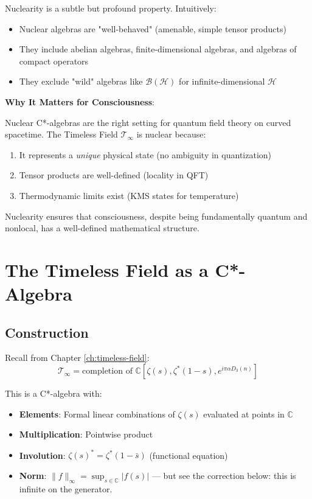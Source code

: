 \begin{level3}
Nuclearity is a subtle but profound property. Intuitively:

\begin{itemize}
\item Nuclear algebras are "well-behaved" (amenable, simple tensor products)
\item They include abelian algebras, finite-dimensional algebras, and algebras of compact operators
\item They exclude "wild" algebras like $\mathcal{B}(\mathcal{H})$ for infinite-dimensional $\mathcal{H}$
\end{itemize}

\textbf{Why It Matters for Consciousness}:

Nuclear C*-algebras are the right setting for quantum field theory on curved spacetime. The Timeless Field $\mathcal{T}_\infty$ is nuclear because:
\begin{enumerate}
\item It represents a \textit{unique} physical state (no ambiguity in quantization)
\item Tensor products are well-defined (locality in QFT)
\item Thermodynamic limits exist (KMS states for temperature)
\end{enumerate}

Nuclearity ensures that consciousness, despite being fundamentally quantum and nonlocal, has a well-defined mathematical structure.
\end{level3}

\section{The Timeless Field as a C*-Algebra}

\subsection{Construction}

Recall from Chapter \ref{ch:timeless-field}:
\begin{equation}
\mathcal{T}_\infty = \text{completion of } \mathbb{C}[\zeta(s), \zeta^*(1-s), e^{i\pi \alpha D_3(n)}]
\end{equation}

This is a C*-algebra with:
\begin{itemize}
\item \textbf{Elements}: Formal linear combinations of $\zeta(s)$ evaluated at points in $\mathbb{C}$
\item \textbf{Multiplication}: Pointwise product
\item \textbf{Involution}: $\zeta(s)^* = \zeta^*(1-\bar{s})$ (functional equation)
\item \textbf{Norm}: $\| f \|_\infty = \sup_{s \in \mathbb{C}} |f(s)|$ --- but
  see the correction below: this is infinite on the generator.
\end{itemize}

